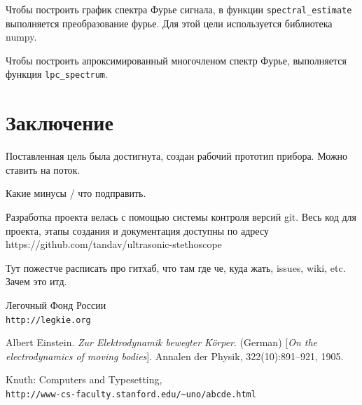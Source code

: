 Чтобы построить график спектра Фурье сигнала, в функции \verb|spectral_estimate| выполняется преобразование фурье. Для этой цели используется библиотека numpy.

Чтобы построить апроксимированный многочленом спектр Фурье, выполняется функция \verb|lpc_spectrum|.

\newpage
\section{Заключение}
Поставленная цель была достигнута, создан рабочий прототип прибора. Можно ставить на поток. 

Какие минусы / что подправить. 

Разработка проекта велась с помощью системы контроля версий git. Весь код для проекта, этапы создания и документация доступны по адресу https://github.com/tandav/ultrasonic-stethoscope

Тут пожестче расписать про гитхаб, что там где че, куда жать, issues, wiki, etc. Зачем это итд. 

\newpage
\begin{thebibliography}{9}
Легочный Фонд России
\\\texttt{http://legkie.org}
 
Albert Einstein. 
\textit{Zur Elektrodynamik bewegter K{\"o}rper}. (German) 
[\textit{On the electrodynamics of moving bodies}]. 
Annalen der Physik, 322(10):891–921, 1905.
 
Knuth: Computers and Typesetting,
\\\texttt{http://www-cs-faculty.stanford.edu/\~{}uno/abcde.html}
\end{thebibliography}



